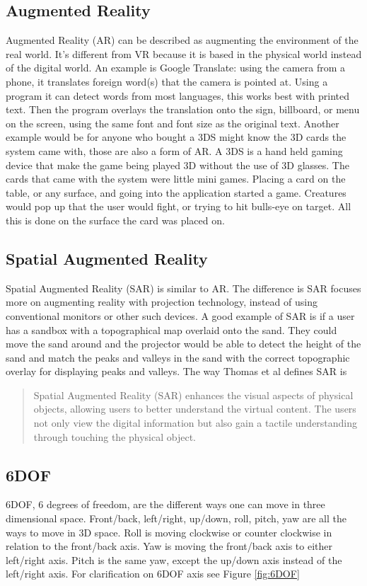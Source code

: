 \documentclass{sig-alternate}
\begin{document}
\subsection{Augmented Reality}
\label{sec:Augmented Reality}
Augmented Reality (AR) can be described as augmenting the environment of the real world. It's different from VR because it is based in the physical world instead of the digital world. An example is Google Translate: using the camera from a phone, it translates foreign word(s) that the camera is pointed at. Using a program it can detect words from most languages, this works best with printed text. Then the program overlays the translation onto the sign, billboard, or menu on the screen, using the same font and font size as the original text. Another example would be for anyone who bought a 3DS might know the 3D cards the system came with, those are also a form of AR. A 3DS is a hand held gaming device that make the game being played 3D without the use of 3D glasses. The cards that came with the system were little mini games. Placing a card on the table, or any surface, and going into the application started a game. Creatures would pop up that the user would fight, or trying to hit bulls-eye on target. All this is done on the surface the card was placed on.   

\subsection{Spatial Augmented Reality}
\label{sec:Spatial Augmented Reality}
Spatial Augmented Reality (SAR) is similar to AR. The difference is SAR focuses more on augmenting reality with projection technology, instead of using conventional monitors or other such devices. A good example of SAR is if a user has a sandbox with a topographical map overlaid onto the sand. They could move the sand around and the projector would be able to detect the height of the sand and match the peaks and valleys in the sand with the correct topographic overlay for displaying peaks and valleys. The way Thomas et al \cite{3D} defines SAR is 
\begin{quote}
Spatial Augmented Reality (SAR) enhances the visual aspects of physical objects, allowing users to better understand the virtual content. The users not only view the digital information but also gain a tactile understanding through touching the physical object.
\end{quote}

\subsection{6DOF}
\label{sec:6DOF}
6DOF, 6 degrees of freedom, are the different ways one can move in three dimensional space. Front/back, left/right, up/down, roll, pitch, yaw are all the ways to move in 3D space. Roll is moving clockwise or counter clockwise in relation to the front/back axis. Yaw is moving the front/back axis to either left/right axis. Pitch is the same yaw, except the up/down axis instead of the left/right axis. For clarification on 6DOF axis see Figure \ref{fig:6DOF}
\end{document}
